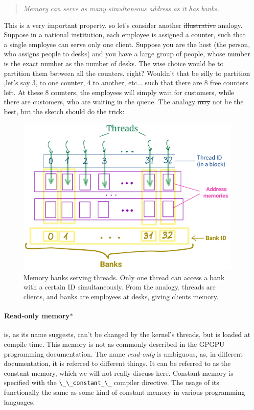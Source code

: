 \begin{quote}
   \textsl{Memory can serve as many simultaneous address as it has banks.} 
\end{quote}
This is a very important property, so let's consider another \sout{illustrative} analogy. Suppose in a national institution, 
each employee 
is assigned a counter, such that a single employee can serve only one client. Suppose you are the host 
(the person, who assigns people to desks)
and you have a large group of people, whose number is the exact number as the number of desks. The wise choice would be to 
partition them between all the counters, right? Wouldn't that be silly to partition ,let's say 3, to one counter, 4 to 
another, etc... such that there are 8 free counters left. At these 8 counters, the employees will simply wait 
for customers, while there are customers, who are waiting in the queue.
The analogy \sout{may} not be the best, but the sketch should do the trick: 

\begin{figure}[H]
   \centering
   \includegraphics[scale=0.18]{pngs/banks1.png}
   \caption{Memory banks serving threads. Only one thread can access a bank with a certain ID simultaneously. 
   From the analogy, threads are clients, and banks are employees at desks, giving clients memory.}
   \label{banks}

\end{figure}

\vspace{-0.5cm}
\paragraph{Read-only memory$\ast$} is, as its name suggests, can't be changed by the kernel's threads, but is loaded at compile time. This memory is not as commonly 
described in the GPGPU programming documentation. 
The name \textit{read-only} is ambiguous, as, in different documentation, it is referred to different things.
It can be referred to as the constant memory, which we will not really discuss here. Constant memory is specified with the \verb|\_\_constant_\_| compiler 
directive. The usage of its functionally the same as some kind of constant memory in various programming languages.

